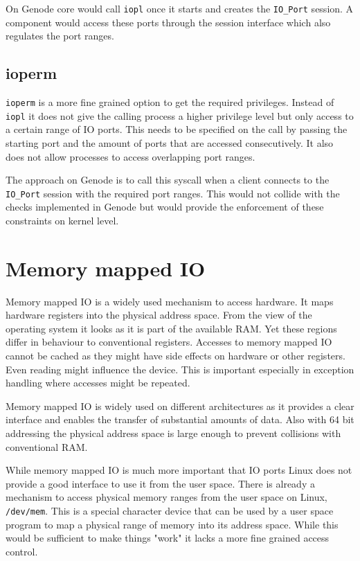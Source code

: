 \documentclass[
a4paper,
12pt,
notitlepage,
parskip=half,
DIV=11,
]{scrbook}
\begin{document}
		On Genode core would call \texttt{iopl} once it starts and creates the \texttt{IO\_Port} session.
		A component would access these ports through the session interface which also regulates the port ranges.
		
		\subsection{ioperm}
		
		\texttt{ioperm} is a more fine grained option to get the required privileges.
		Instead of \texttt{iopl} it does not give the calling process a higher privilege level but only access to a certain range of IO ports.
		This needs to be specified on the call by passing the starting port and the amount of ports that are accessed consecutively.
		It also does not allow processes to access overlapping port ranges. \citep{ioperm}
		
		The approach on Genode is to call this syscall when a client connects to the \texttt{IO\_Port} session with the required port ranges.
		This would not collide with the checks implemented in Genode but would provide the enforcement of these constraints on kernel level.
		
		\section{Memory mapped IO}
		
		Memory mapped IO is a widely used mechanism to access hardware.
		It maps hardware registers into the physical address space.
		From the view of the operating system it looks as it is part of the available RAM.
		Yet these regions differ in behaviour to conventional registers.
		Accesses to memory mapped IO cannot be cached as they might have side effects on hardware or other registers.
		Even reading might influence the device.
		This is important especially in exception handling where accesses might be repeated.
		
		Memory mapped IO is widely used on different architectures as it provides a clear interface and enables the transfer of substantial amounts of data.
		Also with 64 bit addressing the physical address space is large enough to prevent collisions with conventional RAM.
		\citep{intelmanual}
		
		While memory mapped IO is much more important that IO ports Linux does not provide a good interface to use it from the user space.
		There is already a mechanism to access physical memory ranges from the user space on Linux, \texttt{/dev/mem}.
		This is a special character device that can be used by a user space program to map a physical range of memory into its address space.
		While this would be sufficient to make things "work" it lacks a more fine grained access control.
		
\end{document}
